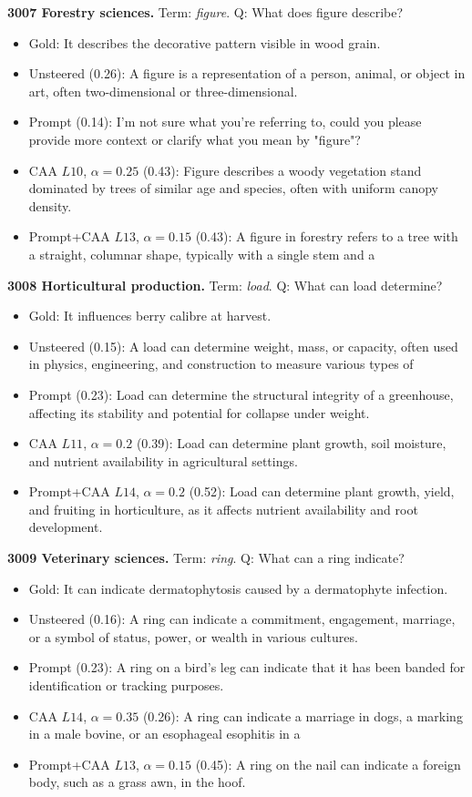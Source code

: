 \medskip\noindent\textbf{3007 Forestry sciences.} Term: \emph{figure}.
Q: What does figure describe?
\begin{itemize}\setlength{\itemsep}{0.15em}\setlength{\parsep}{0pt}\setlength{\topsep}{0.2em}
\item Gold: It describes the decorative pattern visible in wood grain.
\item Unsteered (0.26): A figure is a representation of a person, animal, or object in art, often two-dimensional or three-dimensional.
\item Prompt (0.14): I'm not sure what you're referring to, could you please provide more context or clarify what you mean by "figure"?
\item CAA $L10$, $\alpha=0.25$ (0.43): Figure describes a woody vegetation stand dominated by trees of similar age and species, often with uniform canopy density.
\item Prompt+CAA $L13$, $\alpha=0.15$ (0.43): A figure in forestry refers to a tree with a straight, columnar shape, typically with a single stem and a
\end{itemize}
\medskip\noindent\textbf{3008 Horticultural production.} Term: \emph{load}.
Q: What can load determine?
\begin{itemize}\setlength{\itemsep}{0.15em}\setlength{\parsep}{0pt}\setlength{\topsep}{0.2em}
\item Gold: It influences berry calibre at harvest.
\item Unsteered (0.15): A load can determine weight, mass, or capacity, often used in physics, engineering, and construction to measure various types of
\item Prompt (0.23): Load can determine the structural integrity of a greenhouse, affecting its stability and potential for collapse under weight.
\item CAA $L11$, $\alpha=0.2$ (0.39): Load can determine plant growth, soil moisture, and nutrient availability in agricultural settings.
\item Prompt+CAA $L14$, $\alpha=0.2$ (0.52): Load can determine plant growth, yield, and fruiting in horticulture, as it affects nutrient availability and root development.
\end{itemize}
\medskip\noindent\textbf{3009 Veterinary sciences.} Term: \emph{ring}.
Q: What can a ring indicate?
\begin{itemize}\setlength{\itemsep}{0.15em}\setlength{\parsep}{0pt}\setlength{\topsep}{0.2em}
\item Gold: It can indicate dermatophytosis caused by a dermatophyte infection.
\item Unsteered (0.16): A ring can indicate a commitment, engagement, marriage, or a symbol of status, power, or wealth in various cultures.
\item Prompt (0.23): A ring on a bird's leg can indicate that it has been banded for identification or tracking purposes.
\item CAA $L14$, $\alpha=0.35$ (0.26): A ring can indicate a marriage in dogs, a marking in a male bovine, or an esophageal esophitis in a
\item Prompt+CAA $L13$, $\alpha=0.15$ (0.45): A ring on the nail can indicate a foreign body, such as a grass awn, in the hoof.
\end{itemize}
